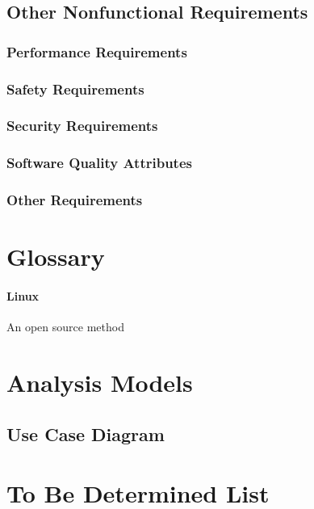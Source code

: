 \documentclass{article}
\begin{document}
\subsection{Other Nonfunctional Requirements}

\subsubsection{Performance Requirements}

\subsubsection{Safety Requirements}

\subsubsection{Security Requirements}

\subsubsection{Software Quality Attributes}


\subsubsection{Other Requirements}

\newpage
\appendix


\section{Glossary}

\paragraph*{Linux} An open source method

\section{Analysis Models}

\subsection{Use Case Diagram}

\section{To Be Determined List}
\end{document}
